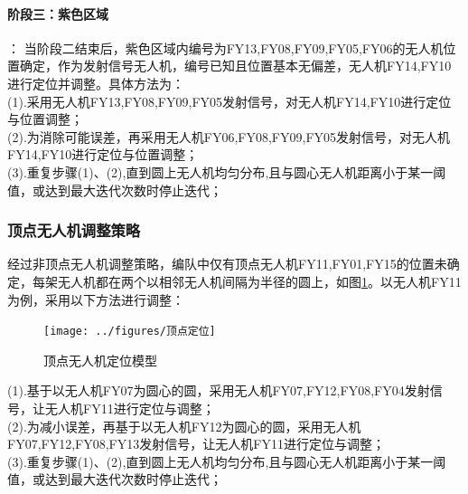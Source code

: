 \documentclass[withoutpreface,bwprint]{cumcmthesis} %
\begin{document}
		\paragraph{阶段三：紫色区域}：
		当阶段二结束后，紫色区域内编号为{FY13,FY08,FY09,FY05,FY06}的无人机位置确定，作为发射信号无人机，编号已知且位置基本无偏差，无人机{FY14,FY10}进行定位并调整。具体方法为：\\
		(1).采用无人机FY13,FY08,FY09,FY05发射信号，对无人机FY14,FY10进行定位与位置调整；\\
		(2).为消除可能误差，再采用无人机FY06,FY08,FY09,FY05发射信号，对无人机FY14,FY10进行定位与位置调整；\\
		(3).重复步骤(1)、(2),直到圆上无人机均匀分布,且与圆心无人机距离小于某一阈值，或达到最大迭代次数时停止迭代；\\
		
		\subsubsection{顶点无人机调整策略}
		
		经过非顶点无人机调整策略，编队中仅有顶点无人机{FY11,FY01,FY15}的位置未确定，每架无人机都在两个以相邻无人机间隔为半径的圆上，如图\ref{顶点}。以无人机FY11为例，采用以下方法进行调整：\\
		\begin{figure}[htb]
			\centering
			\texttt{[image: ../figures/顶点定位]}
			\caption{顶点无人机定位模型}
			\label{顶点}
		\end{figure}
		(1).基于以无人机FY07为圆心的圆，采用无人机FY07,FY12,FY08,FY04发射信号，让无人机FY11进行定位与调整；\\
		(2).为减小误差，再基于以无人机FY12为圆心的圆，采用无人机FY07,FY12,FY08,FY13发射信号，让无人机FY11进行定位与调整；\\
		(3).重复步骤(1)、(2),直到圆上无人机均匀分布,且与圆心无人机距离小于某一阈值，或达到最大迭代次数时停止迭代；\\
\end{document}
